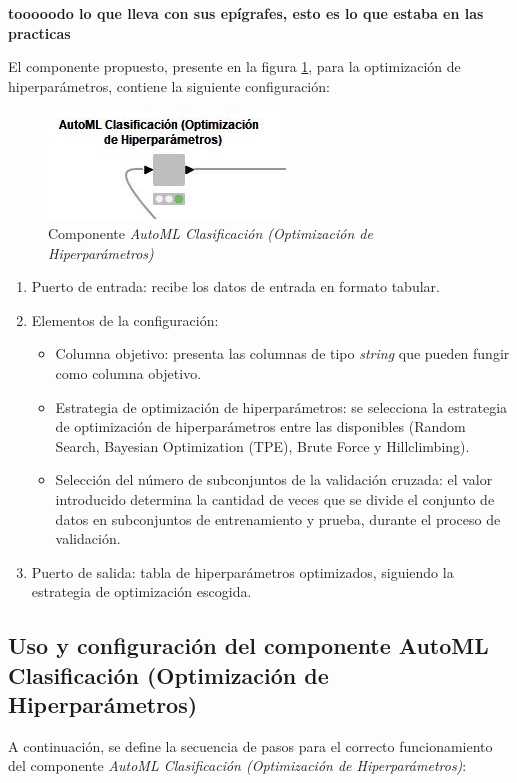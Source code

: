 \textbf{tooooodo lo que lleva con sus epígrafes, esto es lo que estaba en las practicas}

El componente propuesto, presente en la figura \ref{fig:automl-componente-hpo}, para la optimización de hiperparámetros, contiene la siguiente configuración:
\begin{figure}[H]
	\centering
	\includegraphics[width=0.35\linewidth]{"figuras/capi 2/automl-componente-hpo"}
	\caption[Componente AutoML Clasificación (Optimización de Hiperparámetros)]{Componente \textit{AutoML Clasificación (Optimización de Hiperparámetros)}}
	\label{fig:automl-componente-hpo}
\end{figure}
\begin{enumerate}
	\item Puerto de entrada: recibe los datos de entrada en formato tabular.
	\item Elementos de la configuración:
	\begin{itemize}
		\item Columna objetivo: presenta las columnas de tipo \textit{string} que pueden fungir como columna objetivo.
		\item Estrategia de optimización de hiperparámetros: se selecciona la estrategia de optimización de hiperparámetros entre las disponibles (Random Search, Bayesian Optimization (TPE), Brute Force y Hillclimbing).
		\item Selección del número de subconjuntos de la validación cruzada: el valor introducido determina la cantidad de veces que se divide el conjunto de datos en subconjuntos de entrenamiento y prueba, durante el proceso de validación.
	\end{itemize}
	\item Puerto de salida: tabla de hiperparámetros optimizados, siguiendo la estrategia de optimización escogida.
\end{enumerate}

\subsection{Uso y configuración del componente AutoML Clasificación (Optimización de Hiperparámetros)}
A continuación, se define la secuencia de pasos para el correcto funcionamiento del componente \textit{AutoML Clasificación (Optimización de Hiperparámetros)}:

